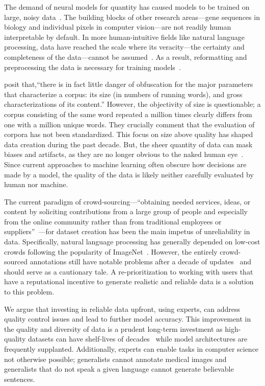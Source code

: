 The demand of neural models for quantity has caused models to be trained on large, noisy data~\citep{brown2020language}.  
%
The building blocks of other research areas---gene sequences in biology and individual pixels in computer vision---are not readily human interpretable by default.  
%
In more human-intuitive fields like natural language processing, data have reached the scale where its veracity---the certainty and completeness of the data---cannot be assumed~\citep{qiu2016survey}.
%
As a result, reformatting and preprocessing the data is necessary for training models~\citep{Hinton2006ReducingTD}.
%

\citet{atkins1992corpus} posit that,``there is in fact little danger of obfuscation for the major parameters that characterize a corpus: its size (in numbers of running words), and gross characterizations of its content.''
%
However, the objectivity of size is questionable; a corpus consisting of the same word repeated a million times clearly differs from one with a million unique words.  
%
They crucially comment that the evaluation of corpora has not been standardized.  
%
This focus on size above quality has shaped data creation during the past decade.  
%
But, the sheer quantity of data can mask biases and artifacts, as they are no longer obvious to the naked human eye~\citep{Pruim2015ICAAROMAAR, Gururangan2018AnnotationAI}.  
%
Since current approaches to machine learning often obscure how decisions are made by a model, the quality of the data is likely neither carefully evaluated by human nor machine.  

The current paradigm of crowd-sourcing---``obtaining needed services, ideas, or content by soliciting contributions from a large group of people and especially from the online community rather than from traditional employees or suppliers''~\citep{mw:crowd}---for dataset creation has been the main impetus of unreliability in data.
%
Specifically, natural language processing has generally depended on low-cost crowds following the popularity of ImageNet~\citep{deng2009imagenet}.  
%
However, the entirely crowd-sourced annotations still have notable problems after a decade of updates~\citep{yang2020towards} and should serve as a cautionary tale. 
%
A re-prioritization to working with users that have a reputational incentive to generate realistic and reliable data is a solution to this problem. 

We argue that investing in reliable data upfront, using experts, can address quality control issues and lead to further model accuracy.   
%
This improvement in the quality and diversity of data  is a prudent long-term investment as high-quality datasets can have shelf-lives of decades~\citep{marcus1993building, Miller95wordnet} while model architectures are frequently supplanted. %
%
Additionally, experts can enable tasks in computer science not otherwise possible; generalists cannot annotate medical images and generalists that do not speak a given language cannot generate believable sentences.  


